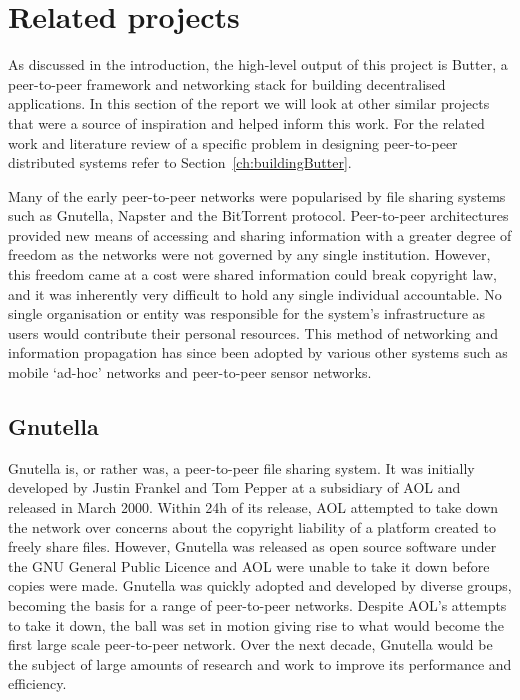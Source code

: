 \chapter{Related projects}
\label{ch:relatedProjects}

As discussed in the introduction, the high-level output of this project is Butter, a peer-to-peer framework and networking stack for building decentralised applications. In this section of the report we will look at other similar projects that were a source of inspiration and helped inform this work. For the related work and literature review of a specific problem in designing peer-to-peer distributed systems refer to Section~\ref{ch:buildingButter}.

Many of the early peer-to-peer networks were popularised by file sharing systems such as Gnutella\cite{gnu2022gnutella}, Napster\cite{tucows2004napster, bartsch2017napster} and the BitTorrent protocol\cite{cohen2008bittorrent}. Peer-to-peer architectures provided new means of accessing and sharing information with a greater degree of freedom as the networks were not governed by any single institution. However, this freedom came at a cost were shared information could break copyright law, and it was inherently very difficult to hold any single individual accountable\cite{benkler2016degrees}. No single organisation or entity was responsible for the system's infrastructure as users would contribute their personal resources. This method of networking and information propagation has since been adopted by various other systems such as mobile `ad-hoc' networks and peer-to-peer sensor networks\cite{ramaswamy2005clustering}.



\section{Gnutella}
\label{sec:gnutella}

Gnutella is, or rather was, a peer-to-peer file sharing system. It was initially developed by Justin Frankel and Tom Pepper at a subsidiary of AOL and released in March 2000. Within 24h of its release, AOL attempted to take down the network over concerns about the copyright liability of a platform created to freely share files. However, Gnutella was released as open source software under the GNU General Public Licence\cite{gpl} and AOL were unable to take it down before copies were made. Gnutella was quickly adopted and developed by diverse groups, becoming the basis for a range of peer-to-peer networks. Despite AOL's attempts to take it down, the ball was set in motion giving rise to what would become the first large scale peer-to-peer network\cite{benkler2016degrees}. Over the next decade, Gnutella would be the subject of large amounts of research and work to improve its performance and efficiency\cite{lua2005survey}.

